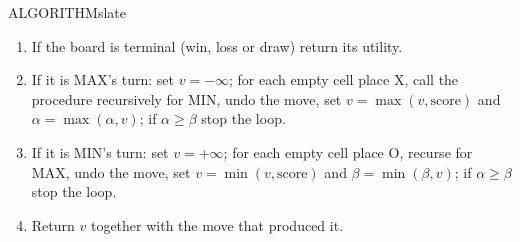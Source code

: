 \documentclass[11pt,a4paper]{article}
\newenvironment{algorithm}{\begin{secbox}{ALGORITHM}{slate}}{\end{secbox}}
\begin{document}
\begin{algorithm}
\begin{enumerate}
  \item If the board is terminal (win, loss or draw) return its utility.
  \item If it is MAX's turn: set $v=-\infty$; for each empty cell place X, call the procedure recursively for MIN, undo the move, set $v=\max(v,\text{score})$ and $\alpha=\max(\alpha,v)$; if $\alpha\ge\beta$ stop the loop.
  \item If it is MIN's turn: set $v=+\infty$; for each empty cell place O, recurse for MAX, undo the move, set $v=\min(v,\text{score})$ and $\beta=\min(\beta,v)$; if $\alpha\ge\beta$ stop the loop.
  \item Return $v$ together with the move that produced it.
\end{enumerate}
\end{algorithm}
\end{document}
